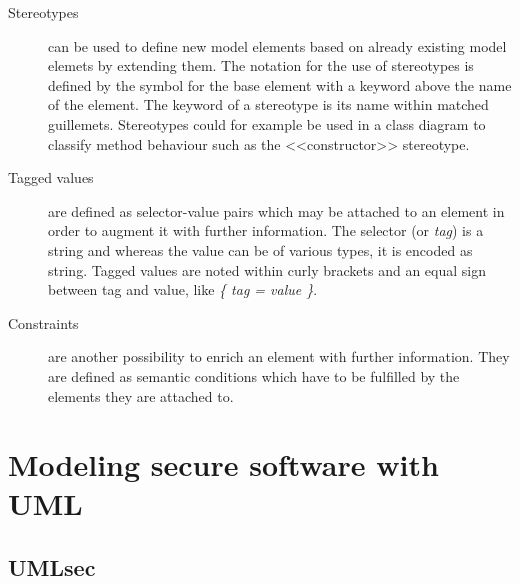 \documentclass{acmtog} %
\begin{document}
\begin{description}
	\item[Stereotypes] can be used to define new model elements based on already existing model elemets by extending them.
	The notation for the use of stereotypes is defined by the symbol for the base element with a keyword above the name of the element.
	The keyword of a stereotype is its name within matched guillemets.
	Stereotypes could for example be used in a class diagram to classify method behaviour such as the <<constructor>> stereotype.

	\item[Tagged values] are defined as selector-value pairs which may be attached to an element in order to augment it with further information.
	The selector (or \textit{tag}) is a string and whereas the value can be of various types, it is encoded as string.
	Tagged values are noted within curly brackets and an equal sign between tag and value, like \textit{\{ tag = value \}}.

	\item[Constraints] are another possibility to enrich an element with further information.
	They are defined as semantic conditions which have to be fulfilled by the elements they are attached to.
\end{description}

\section{Modeling secure software with UML}
\label{sec:secure-software-with-uml}

\subsection{UMLsec}
\label{sec:umlsec}
\end{document}
